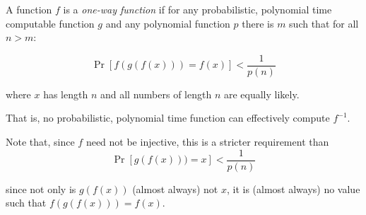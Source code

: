 \documentclass[12pt]{article}
\begin{document}
A function $f$ is a \emph{one-way function} if for any probabilistic, polynomial time computable function $g$ and any polynomial function $p$ there is $m$ such that for all $n>m$:

$$\operatorname{Pr}[f(g(f(x)))=f(x)]<\frac{1}{p(n)}$$

where $x$ has length $n$ and all numbers of length $n$ are equally likely.

That is, no probabilistic, polynomial time function can effectively compute $f^{-1}$.

Note that, since $f$ need not be injective, this is a stricter requirement than
$$\operatorname{Pr}[g(f(x)))=x]<\frac{1}{p(n)}$$

since not only is $g(f(x))$ (almost always) not $x$, it is (almost always) no value such that $f(g(f(x)))=f(x)$.
\end{document}
